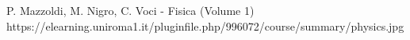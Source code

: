 \documentclass[12pt,a4paper,openright,oneside]{book}
\begin{document}

\clearpage\null\thispagestyle{empty}\clearpage       %
\tableofcontents %

\pagestyle{plain}






\begin{thebibliography}{999}

P. Mazzoldi, M. Nigro, C. Voci - Fisica (Volume 1)
https://elearning.uniroma1.it/pluginfile.php/996072/course/summary/physics.jpg
\end{thebibliography}
\end{document}
